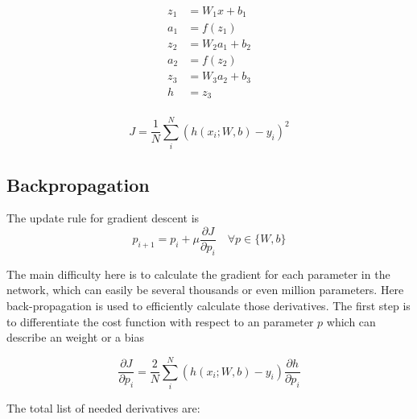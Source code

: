 \documentclass[11pt]{article}
\begin{document}
\begin{align*}
    z_1 &= W_1 x + b_1 \\
    a_1 &= f(z_1)      \\
    z_2 &= W_2 a_1 + b_2 \\
    a_2 &= f(z_2)      \\
    z_3 &= W_3 a_2 + b_3 \\
    h   &= z_3         \\
\end{align*}

\begin{equation}
    J = \frac{1}{N} \sum_i^N (h(x_i;W,b)-y_i)^2
\end{equation}

\subsection{Backpropagation}

The update rule for gradient descent is
\begin{equation}
    p_{i+1} = p_i + \mu \frac{\partial J}{\partial p_i}  \quad \forall p \in \{ W, b \} 
\end{equation}

The main difficulty here is to calculate the gradient for each parameter in the network, which can easily be several thousands or even million parameters. Here back-propagation is used to efficiently calculate those derivatives. The first step is to differentiate the cost function with respect to an parameter $p$ which can describe an weight or a bias

\begin{equation}
    \frac{\partial J}{\partial p_i}  = \frac{2}{N} \sum_i^N (h(x_i;W,b)-y_i) \frac{\partial h}{\partial p_i} 
\end{equation}

The total list of needed derivatives are: 
\end{document}
